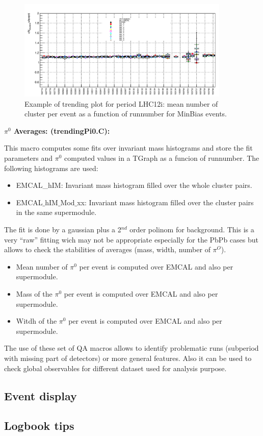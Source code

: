 \begin{figure}[ht]
\begin{center}
\includegraphics[width=0.9\textwidth]{figures/trendingClusterLHC12iMB.pdf}
\end{center}
\caption{\label{fig:trendingCluster}
Example of trending plot for period LHC12i: mean number of cluster per event as a function of runnumber for MinBias events.}
\end{figure}



{\bf $\pi^0$ Averages: (trendingPi0.C):}

This macro computes some fits over invariant mass histograms and store the fit parameters and $\pi^0$ computed values in a TGraph as a funcion of runnumber. The following histograms are used:
\begin{itemize}
\item EMCAL\_hIM: Invariant mass histogram filled over the whole cluster pairs.
\item EMCAL$\_$hIM$\_$Mod$\_$xx: Invariant mass histogram filled over the cluster pairs in the same supermodule.
\end{itemize}

The fit is  done by a gaussian plus  a 2$^{nd}$ order polinom for background. This is a very ``raw'' fitting wich may not be appropriate especially for the PbPb cases but allows to check the stabilities of averages (mass, width, number of $\pi^O$).



\begin{itemize}
\item Mean number of  $\pi^0$ per event is computed over EMCAL and also per supermodule.
\item Mass of the $\pi^0$ per event is computed over EMCAL and also per supermodule.
\item Witdh of the $\pi^0$ per event is computed over EMCAL and also per supermodule.
\end{itemize}



The use of these set of QA macros allows to identify problematic runs (subperiod with missing part of detectors) or more general features. Also it can be used to check global observables for different dataset used for analysis purpose. 



\subsection{Event display}

\subsection{Logbook tips}
